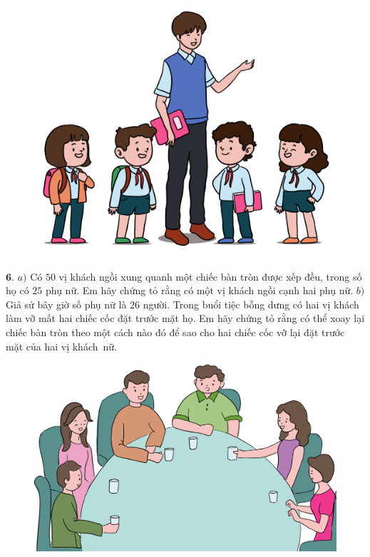\begin{multicols}{2}
	\begin{figure}[H]
		\centering
		\captionsetup{labelformat= empty, justification=centering}
		\includegraphics[width=1\linewidth]{Pi10_ToanBi_Bai5}
		\vspace*{-15pt}
	\end{figure}
	$\pmb{6.}$ $a)$  Có $50$ vị khách ngồi xung quanh một chiếc bàn tròn được xếp đều, trong số họ có $25$ phụ nữ. Em hãy chứng tỏ rằng có một vị khách ngồi cạnh hai phụ nữ.
	\vskip 0.1cm
	$b)$ Giả sử bây giờ số phụ nữ là $26$ người. Trong buổi tiệc bỗng dưng có hai vị khách làm vỡ mất hai chiếc cốc đặt trước mặt họ. Em hãy chứng tỏ rằng có thể xoay lại chiếc bàn tròn theo một cách nào đó để sao cho hai chiếc cốc vỡ lại đặt trước mặt của hai vị khách~nữ.
	\begin{figure}[H]
		\centering
		\vspace*{-10pt}
		\captionsetup{labelformat= empty, justification=centering}
		\includegraphics[width=1\linewidth]{Pi10_ToanBi_Bai6}
	\end{figure}
\end{multicols}
